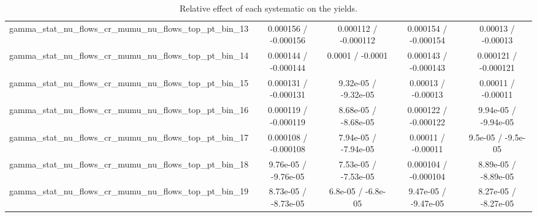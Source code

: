 \documentclass[10pt]{article}
\begin{document}
\begin{table}[htbp]
\begin{center}
\begin{tabular}{|c|c|c|c|c|}
  gamma_stat_nu_flows_cr_mumu_nu_flows_top_pt_bin_13 & 0.000156 / -0.000156 & 0.000112 / -0.000112 & 0.000154 / -0.000154 & 0.00013 / -0.00013 \\ 
  gamma_stat_nu_flows_cr_mumu_nu_flows_top_pt_bin_14 & 0.000144 / -0.000144 & 0.0001 / -0.0001 & 0.000143 / -0.000143 & 0.000121 / -0.000121 \\ 
  gamma_stat_nu_flows_cr_mumu_nu_flows_top_pt_bin_15 & 0.000131 / -0.000131 & 9.32e-05 / -9.32e-05 & 0.00013 / -0.00013 & 0.00011 / -0.00011 \\ 
  gamma_stat_nu_flows_cr_mumu_nu_flows_top_pt_bin_16 & 0.000119 / -0.000119 & 8.68e-05 / -8.68e-05 & 0.000122 / -0.000122 & 9.94e-05 / -9.94e-05 \\ 
  gamma_stat_nu_flows_cr_mumu_nu_flows_top_pt_bin_17 & 0.000108 / -0.000108 & 7.94e-05 / -7.94e-05 & 0.00011 / -0.00011 & 9.5e-05 / -9.5e-05 \\ 
  gamma_stat_nu_flows_cr_mumu_nu_flows_top_pt_bin_18 & 9.76e-05 / -9.76e-05 & 7.53e-05 / -7.53e-05 & 0.000104 / -0.000104 & 8.89e-05 / -8.89e-05 \\ 
  gamma_stat_nu_flows_cr_mumu_nu_flows_top_pt_bin_19 & 8.73e-05 / -8.73e-05 & 6.8e-05 / -6.8e-05 & 9.47e-05 / -9.47e-05 & 8.27e-05 / -8.27e-05 \\ 
\hline 
\end{tabular} 
\caption{Relative effect of each systematic on the yields.} 
\end{center} 
\end{table} 
\end{document}
